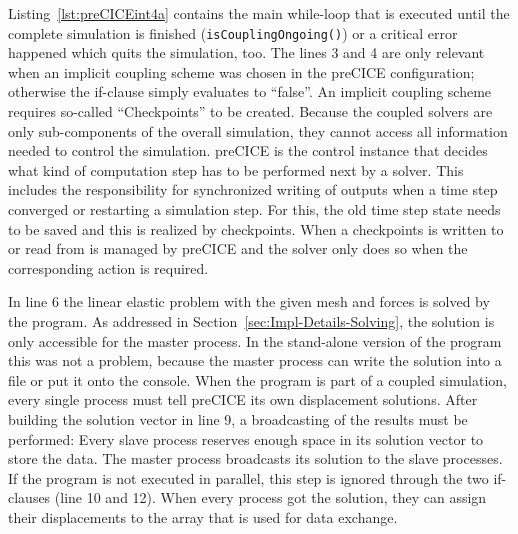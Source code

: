    Listing~\ref{lst:preCICEint4a} contains the main while-loop that is executed until the complete simulation is finished (\texttt{isCouplingOngoing()}) or a critical error happened which quits the simulation, too. The lines 3 and 4 are only relevant when an implicit coupling scheme was chosen in the preCICE configuration; otherwise the if-clause simply evaluates to ``false''. An implicit coupling scheme requires so-called ``Checkpoints'' to be created. Because the coupled solvers are only sub-components of the overall simulation, they cannot access all information needed to control the simulation. preCICE is the control instance that decides what kind of computation step has to be performed next by a solver. This includes the responsibility for synchronized writing of outputs when a time step converged or restarting a simulation step. For this, the old time step state needs to be saved and this is realized by checkpoints. When a checkpoints is written to or read from is managed by preCICE and the solver only does so when the corresponding action is required.
   
   In line 6 the linear elastic problem with the given mesh and forces is solved by the program. As addressed in Section~\ref{sec:Impl-Details-Solving}, the solution is only accessible for the master process. In the stand-alone version of the program this was not a problem, because the master process can write the solution into a file or put it onto the console. When the program is part of a coupled simulation, every single process must tell preCICE its own displacement solutions. After building the solution vector in line 9, a broadcasting of the results must be performed: Every slave process reserves enough space in its solution vector to store the data. The master process broadcasts its solution to the slave processes. If the program is not executed in parallel, this step is ignored through the two if-clauses (line 10 and 12). When every process got the solution, they can assign their displacements to the array that is used for data exchange.
   

